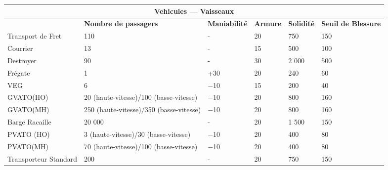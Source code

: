 \begin{table} \begin{tabularx}{\textwidth}{|l|X|l|X|l|l|} \hline

\multicolumn{6}{|c|}{\textbf{Vehicules --- Vaisseaux}} \\ \hline

&\textbf{Nombre de passagers}	&\textbf{Maniabilité}	&\textbf{Armure}	&\textbf{Solidité}	&\textbf{Seuil de Blessure}\\ \hline

Transport de Fret	&110	&- &20	&750	&150 \\ \hline

Courrier	&13	&- &15	&500	&100 \\ \hline

Destroyer	&90	&- &30	&2 000	&500 \\ \hline

Frégate	&1	&+30	&20	&240	&60 \\ \hline

VEG	&6	&$-$10	&15	&200	&40 \\ \hline

GVATO(HO)	&20 (haute-vitesse)/100 (basse-vitesse)	&$-$10	&20	&800	&160 \\ \hline

GVATO(MH)	&250 (haute-vitesse)/350 (basse-vitesse)	&$-$10	&20	&800	&160 \\ \hline

Barge Racaille	&20 000	&- &20	&1 500	&150 \\ \hline

PVATO (HO)	&3 (haute-vitesse)/30 (basse-vitesse)	&$-$10	&20	&400	&80 \\ \hline

PVATO(MH)	&70 (haute-vitesse)/100 (basse-vitesse)	&$-$10	&20	&400	&80 \\ \hline

Transporteur Standard	&200	&- &20	&750	&150 \\ \hline

\end{tabularx} \label{tab:spacecraft} \end{table} 



